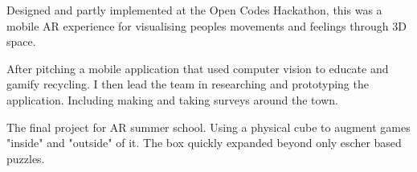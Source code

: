 \documentclass[a4paper]{deedy-resume} %
\begin{document}
\begin{minipage}[t]{0.66\textwidth}
  Designed and partly implemented at the Open Codes Hackathon, this was a mobile AR experience for visualising peoples movements and feelings through 3D space.

  \sectionspace %


  After pitching a mobile application that used computer vision to educate and gamify recycling. %
  I then lead the team in researching and prototyping the application.
  Including making and taking surveys around the town. %

  \sectionspace %



  The final project for AR summer school. Using a physical cube to augment games "inside" and "outside" of it. The box quickly expanded beyond only escher based puzzles.%


\end{minipage}
\end{document}

